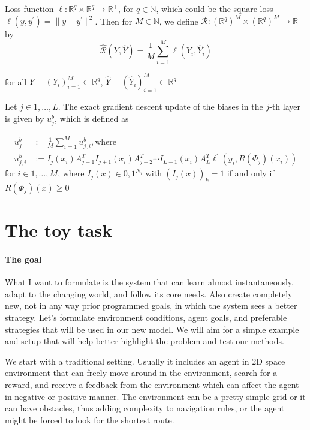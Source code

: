 \documentclass[draft]{article}
\def\RealSet{\mathbb{R}}
\begin{document}
Loss function $\ell \colon \RealSet^q \times  \RealSet^q \rightarrow  \RealSet^{+}$, for $q \in \mathbb{N}$, which could be the square loss $\ell(y,y^\prime)=\| y - y^\prime \|^2$. Then for $M \in \mathbb{N}$, we define $\mathcal{R} \colon (\RealSet^q)^M \times (\RealSet^q)^M \rightarrow \RealSet$ by
\[
\hat{\mathcal{R}} (Y,\hat Y) = \frac1{M} \sum_{i=1}^M \ell(Y_i, \hat Y_i)
\]

for all $Y=(Y_i)_{i=1}^M \subset \RealSet^q$, $\hat Y = (\hat Y_i)_{i=1}^M \subset \RealSet^q$

Let $j \in {1,\ldots,L}$. The exact gradient descent update of the biases in the $j$-th layer is given by $u_j^b$, which is defined as

\begin{align}
u_j^b &:= \frac1{M} \sum_{i=1}^M u_{j,i}^b, \text{where} \\
u_{j,i}^b &:= I_j(x_i)A_{j+1}^T I_{j+1}(x_i) A_{j+2}^T \cdots I_{L-1}(x_i)A_L^T \ell^\prime(y_i, R(\Phi_j)(x_i))
\end{align}
for $i\in {1,\ldots,M}$, where $I_j(x)\in{0,1}^{N_j}$ with $(I_j(x))_k = 1$ if and only if $R(\Phi_j)(x)\geqslant0$


\section{The toy task}

\paragraph{The goal}
What I want to formulate is the system that can learn almost instantaneously, adapt to the changing world, and follow its core needs. Also create completely new, not in any way prior programmed goals, in which the system sees a better strategy. Let’s formulate environment conditions, agent goals, and preferable strategies that will be used in our new model. We will aim for a simple example and setup that will help better highlight the problem and test our methods.

We start with a traditional setting. Usually it includes an agent in 2D space environment that can freely move around in the environment, search for a reward, and receive a feedback from the environment which can affect the agent in negative or positive manner. The environment can be a pretty simple grid or it can have obstacles, thus adding complexity to navigation rules, or the agent might be forced to look for the shortest route.
\end{document}
